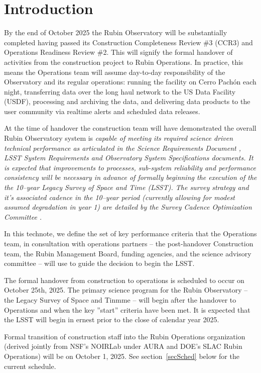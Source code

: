 \section{Introduction}

By the end of October 2025 the Rubin Observatory will be substantially completed having passed its Construction Completeness Review \#3 (CCR3) and Operations Readiness Review \#2.  This will signify the formal handover of activities from the construction project to Rubin Operations. In practice, this means the Operations team \cite[see][]{RDO-018} will assume day-to-day responsibility of the Observatory and its regular operations: running the facility on Cerro Pach\'{o}n each night, transferring data over the long haul network to the US Data Facility (USDF), processing and archiving the data, and delivering data products to the user community via realtime alerts and scheduled data releases. 

At the time of handover the construction team will have demonstrated the overall Rubin Observatory system is \it{capable} of meeting its required science driven technical performance as articulated in the Science Requirements Document \cite{SRD}, LSST System Requirements \cite{LSR} and Observatory System Specifications \cite{OSS} documents.  It is expected that improvements to processes, sub-system reliability and performance consistency will be necessary in advance of formally beginning the execution of the the 10--year Legacy Survey of Space and Time (LSST). The survey strategy and it's associated cadence in the 10--year period (currently allowing for modest assumed degradation in year 1) are detailed by the Survey Cadence Optimization Committee \cite[SCOC,][]{PSTN-056}. 

In this technote, we define the set of key performance criteria that the Operations team, in consultation with operations partners -- the post-handover Construction team, the Rubin Management Board, funding agencies, and the science advisory committee -- will use to guide the decision to begin the LSST. 

The formal handover from construction to operations is scheduled to occur on October 25th, 2025. The primary science program for the Rubin Observatory -- the Legacy Survey of Space and Tinmme -- will begin after the handover to Operations and when the key ''start'' criteria have been met.  It is expected that the LSST will begin in ernest prior to the close of calendar year 2025.

Formal transition of construction staff into the Rubin Operations organization (derived jointly from NSF's NOIRLab under AURA and DOE's SLAC Rubin Operations) will be on October 1, 2025. See section~\ref{secSched} below for the current schedule.  
